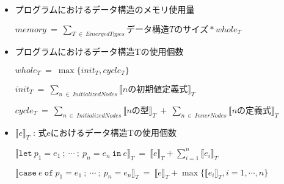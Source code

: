 \begin{figure}[p]
\begin{framed}
  \begin{itemize}
    \item プログラムにおけるデータ構造のメモリ使用量 \vspace{10pt}

    \begin{math}
      memory \ = \
      \sum_{T \ \in \ EmergedTypes} データ構造Tのサイズ * whole_T
    \end{math}

  \item プログラムにおけるデータ構造Tの使用個数 \vspace{10pt}

  \begin{math}
    whole_T \ = \
    \max \{init_T, cycle_T\}
  \end{math}
  \vspace{10pt}

  \begin{math}
    init_T \ = \
    \sum_{n \ \in \ InitializedNodes} \llbracket nの初期値定義式 \rrbracket _T
  \end{math}
  \vspace{10pt}

  \begin{math}
    cycle_T \ = \
    \sum_{n \ \in \ InitializedNodes} \llbracket nの型 \rrbracket _T
    \ + \
    \sum_{n \ \in \ InnerNodes} \llbracket nの定義式 \rrbracket _T
  \end{math}

  \item $\llbracket e \rrbracket _T $ : 式eにおけるデータ構造Tの使用個数  \vspace{10pt}

  \begin{math}
    \llbracket \texttt{let} \ p_1 = e_1 \ ; \ \cdots \ ; \ p_n = e_n \ \texttt{in} \ e\rrbracket _T
    \ = \
    \llbracket e \rrbracket _T + \sum^n_{i=1} \llbracket e_i \rrbracket _T
  \end{math}
  \vspace{10pt}

  \begin{math}
    \llbracket \texttt{case} \ e \ \texttt{of} \ p_1 = e_1 \
    ; \ \cdots \ ; \ p_n = e_n \rrbracket _T
    \ = \
    \llbracket e \rrbracket _T + \max \{ \llbracket e_i \rrbracket _T, i = 1, \cdots, n \}
  \end{math}
  \vspace{10pt}


\end{itemize}
\end{framed}
\end{figure}
